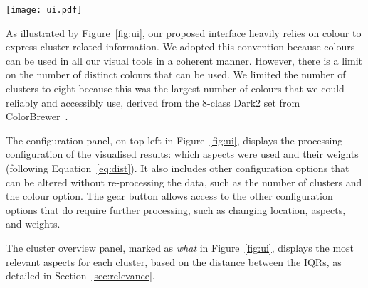 \begin{figure*}
    \centering 
    \texttt{[image: ui.pdf]}
    \caption{Initial interface of our method showing the demographic evolution of Chicago and identifying the objectives of each plot.
        \textbf{(what)}: Cluster overview illustrating the most relevant aspect for each cluster. 
        \textbf{(where)}: Maps illustrating the geographical location, both as an overall summary and for each year.
        \textbf{(how)}: Tabular and visual summmarisation of how the regions classification changed over time.
        \textbf{(who)}: Demographic details for the currently selected data.
        \label{fig:ui}}
\end{figure*}


As illustrated by Figure~\ref{fig:ui}, our proposed
interface heavily relies on colour to express cluster-related information. We
adopted this convention because colours can be used in all our visual tools in a
coherent manner. However, there is a limit on the number of distinct colours
that can be used. We limited the number of clusters to eight because this was
the largest number of colours that we could reliably and accessibly use, derived
from the 8-class Dark2 set from ColorBrewer~\citep{ColorBrewer}. 


The configuration panel, on top left in Figure~\ref{fig:ui}, displays the
processing configuration of the visualised results: which aspects were used and
their weights (following Equation~\ref{eq:dist}). It also includes other
configuration options that can be altered without re-processing the data, such
as the number of clusters and the colour option. The gear button allows access
to the other configuration options that do require further processing, such as
changing location, aspects, and weights. 


The cluster overview panel, marked as \emph{what} in Figure~\ref{fig:ui},
displays the most relevant aspects for each cluster, based on the distance
between the IQRs, as detailed in Section~\ref{sec:relevance}.


